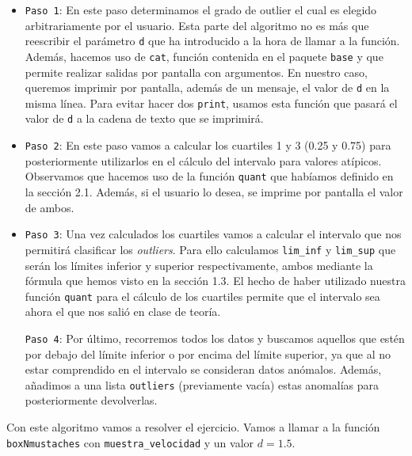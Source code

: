 \documentclass[12pt]{report}\usepackage[]{graphicx}\usepackage[dvipsnames]{xcolor}
\begin{document}
					\begin{itemize}
						\item \texttt{Paso 1}: En este paso determinamos el grado de outlier el cual es elegido arbitrariamente por el usuario. Esta parte del algoritmo no es más que reescribir el parámetro \texttt{d} que ha introducido a la hora de llamar a la función. Además, hacemos uso de \texttt{cat}, función contenida en el paquete \texttt{base} y que permite realizar salidas por pantalla con argumentos. En nuestro caso, queremos imprimir por pantalla, además de un mensaje, el valor de \texttt{d} en la misma línea. Para evitar hacer dos \texttt{print}, usamos esta función que pasará el valor de \texttt{d} a la cadena de texto que se imprimirá.
						
						\item \texttt{Paso 2}: En este paso vamos a calcular los cuartiles 1 y 3 (0.25 y 0.75) para posteriormente utilizarlos en el cálculo del intervalo para valores atípicos. Observamos que hacemos uso de la función \texttt{quant} que habíamos definido en la sección 2.1. Además, si el usuario lo desea, se imprime por pantalla el valor de ambos.
						
						\item \texttt{Paso 3}: Una vez calculados los cuartiles vamos a calcular el intervalo que nos permitirá clasificar los \textit{outliers}. Para ello calculamos \texttt{lim\_inf} y \texttt{lim\_sup} que serán los límites inferior y superior respectivamente, ambos mediante la fórmula que hemos visto en la sección 1.3. El hecho de haber utilizado nuestra función \texttt{quant} para el cálculo de los cuartiles permite que el intervalo sea ahora el que nos salió en clase de teoría.
						
						\texttt{Paso 4}: Por último, recorremos todos los datos y buscamos aquellos que estén por debajo del límite inferior o por encima del límite superior, ya que al no estar comprendido en el intervalo se consideran datos anómalos. Además, añadimos a una lista \texttt{outliers} (previamente vacía) estas anomalías para posteriormente devolverlas.\\
					\end{itemize}
					
					Con este algoritmo vamos a resolver el ejercicio. Vamos a llamar a la función \texttt{boxNmustaches} con \texttt{muestra\_velocidad} y un valor $d = 1.5$.\\
					
\end{document}
